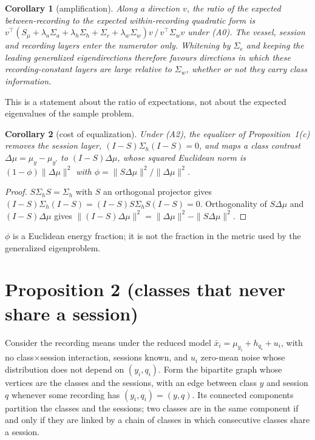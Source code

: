 \documentclass[10pt]{article}
\newtheorem{corollary}{Corollary}
\begin{document}
\begin{corollary}[amplification]
Along a direction $v$, the ratio of the expected between-recording to the expected within-recording quadratic form is
$v^{\top}(S_\mu+\lambda_a\Sigma_a+\lambda_h\Sigma_h+\Sigma_c+\lambda_w\Sigma_w)v\,/\,v^{\top}\Sigma_wv$ under (A0). The vessel, session and recording layers enter the numerator only. Whitening by $\Sigma_e$ and keeping the leading generalized eigendirections therefore favours directions in which these recording-constant layers are large relative to $\Sigma_w$, whether or not they carry class information.
\end{corollary}
\noindent This is a statement about the ratio of expectations, not about the expected eigenvalues of the sample problem.

\begin{corollary}[cost of equalization]
Under (A2), the equalizer of Proposition~1(c) removes the session layer, $(I-S)\Sigma_h(I-S)=0$, and maps a class contrast $\Delta\mu=\mu_y-\mu_{y'}$ to $(I-S)\Delta\mu$, whose squared Euclidean norm is $(1-\phi)\|\Delta\mu\|^2$ with $\phi=\|S\Delta\mu\|^2/\|\Delta\mu\|^2$.
\end{corollary}
\begin{proof}
$S\Sigma_hS=\Sigma_h$ with $S$ an orthogonal projector gives $(I-S)\Sigma_h(I-S)=(I-S)S\Sigma_hS(I-S)=0$. Orthogonality of $S\Delta\mu$ and $(I-S)\Delta\mu$ gives $\|(I-S)\Delta\mu\|^2=\|\Delta\mu\|^2-\|S\Delta\mu\|^2$.
\end{proof}
\noindent $\phi$ is a Euclidean energy fraction; it is not the fraction in the metric used by the generalized eigenproblem.

\section{Proposition 2 (classes that never share a session)}
Consider the recording means under the reduced model $\bar x_i=\mu_{y_i}+h_{q_i}+u_i$, with no class$\times$session interaction, sessions known, and $u_i$ zero-mean noise whose distribution does not depend on $(y_i,q_i)$. Form the bipartite graph whose vertices are the classes and the sessions, with an edge between class $y$ and session $q$ whenever some recording has $(y_i,q_i)=(y,q)$. Its connected components partition the classes and the sessions; two classes are in the same component if and only if they are linked by a chain of classes in which consecutive classes share a session.
\end{document}
